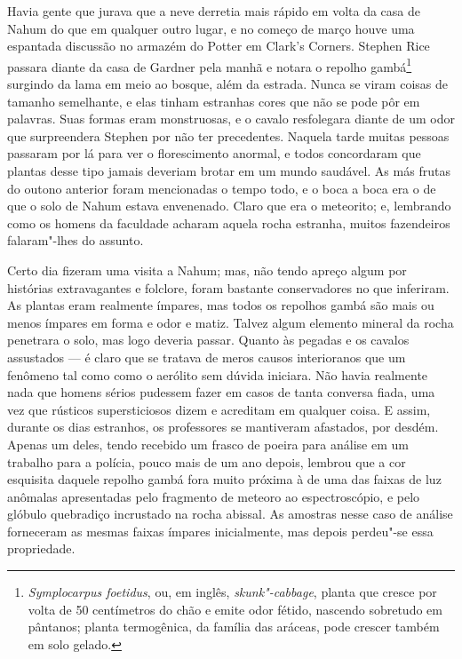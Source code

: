 Havia gente que jurava que a neve derretia mais rápido em volta da casa
de Nahum do que em qualquer outro lugar, e no começo de março houve uma
espantada discussão no armazém do Potter em Clark's Corners. Stephen
Rice passara diante da casa de Gardner pela manhã e notara o repolho
gambá\footnote{\textit{Symplocarpus foetidus}, ou, em inglês,
  \textit{skunk"-cabbage}, planta que cresce por volta de 50 centímetros do chão e
  emite odor fétido, nascendo sobretudo em pântanos; planta termogênica,
  da família das aráceas, pode crescer também em solo gelado.} surgindo
da lama em meio ao bosque, além da estrada. Nunca se viram coisas de
tamanho semelhante, e elas tinham estranhas cores que não se pode pôr em
palavras. Suas formas eram monstruosas, e o cavalo resfolegara diante de
um odor que surpreendera Stephen por não ter precedentes. Naquela tarde
muitas pessoas passaram por lá para ver o florescimento anormal, e todos
concordaram que plantas desse tipo jamais deveriam brotar em um mundo
saudável. As más frutas do outono anterior foram mencionadas o tempo
todo, e o boca a boca era o de que o solo de Nahum estava envenenado.
Claro que era o meteorito; e, lembrando como os homens da faculdade
acharam aquela rocha estranha, muitos fazendeiros falaram"-lhes do
assunto.

Certo dia fizeram uma visita a Nahum; mas, não tendo apreço algum por
histórias extravagantes e folclore, foram bastante conservadores no que
inferiram. As plantas eram realmente ímpares, mas todos os repolhos
gambá são mais ou menos ímpares em forma e odor e matiz. Talvez algum
elemento mineral da rocha penetrara o solo, mas logo deveria passar.
Quanto às pegadas e os cavalos assustados --- é claro que se tratava de
meros causos interioranos que um fenômeno tal como como o aerólito sem
dúvida iniciara. Não havia realmente nada que homens sérios pudessem
fazer em casos de tanta conversa fiada, uma vez que rústicos
supersticiosos dizem e acreditam em qualquer coisa. E assim, durante os
dias estranhos, os professores se mantiveram afastados, por desdém.
Apenas um deles, tendo recebido um frasco de poeira para análise em um
trabalho para a polícia, pouco mais de um ano depois, lembrou que a cor
esquisita daquele repolho gambá fora muito próxima à de uma das faixas
de luz anômalas apresentadas pelo fragmento de meteoro ao
espectroscópio, e pelo glóbulo quebradiço incrustado na rocha abissal.
As amostras nesse caso de análise forneceram as mesmas faixas ímpares
inicialmente, mas depois perdeu"-se essa propriedade.

